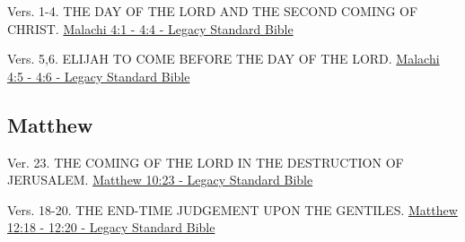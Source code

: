 \documentclass[
  ignorenonframetext,
]{beamer}
\begin{document}
\begin{frame}{4}
\label{section-149}
\begin{block}{Vers. 1-4. THE DAY OF THE LORD AND THE SECOND COMING OF
CHRIST.}
\label{vers.-1-4.-the-day-of-the-lord-and-the-second-coming-of-christ.}
\href{https://read.lsbible.org/?q=mal4\%3A1-4}{Malachi 4:1 - 4:4 -
Legacy Standard Bible}
\end{block}

\begin{block}{Vers. 5,6. ELIJAH TO COME BEFORE THE DAY OF THE LORD.}
\label{vers.-56.-elijah-to-come-before-the-day-of-the-lord.}
\href{https://read.lsbible.org/?q=mal4\%3A5-6}{Malachi 4:5 - 4:6 -
Legacy Standard Bible}
\end{block}
\end{frame}

\subsection{Matthew}\label{matthew}

\begin{frame}{10}
\label{section-150}
\begin{block}{Ver. 23. THE COMING OF THE LORD IN THE DESTRUCTION OF
JERUSALEM.}
\label{ver.-23.-the-coming-of-the-lord-in-the-destruction-of-jerusalem.}
\href{https://read.lsbible.org/?q=matt10\%3A23}{Matthew 10:23 - Legacy
Standard Bible}
\end{block}
\end{frame}

\begin{frame}{12}
\label{section-151}
\begin{block}{Vers. 18-20. THE END-TIME JUDGEMENT UPON THE GENTILES.}
\label{vers.-18-20.-the-end-time-judgement-upon-the-gentiles.}
\href{https://read.lsbible.org/?q=matt12\%3A18-20}{Matthew 12:18 - 12:20
- Legacy Standard Bible}
\end{block}
\end{frame}
\end{document}
